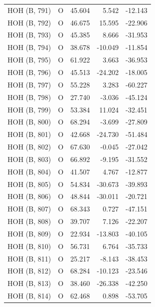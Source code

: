 \begin{longtable}{@{}lcrr@{}}
  \cmidrule(r){1-5}
  HOH (B, 791) & O & 45.604 & 5.542 & -12.143 \\
  \cmidrule(r){1-5}
  HOH (B, 792) & O & 46.675 & 15.595 & -22.906 \\
  \cmidrule(r){1-5}
  HOH (B, 793) & O & 45.385 & 8.666 & -31.953 \\
  \cmidrule(r){1-5}
  HOH (B, 794) & O & 38.678 & -10.049 & -11.854 \\
  \cmidrule(r){1-5}
  HOH (B, 795) & O & 61.922 & 3.663 & -36.953 \\
  \cmidrule(r){1-5}
  HOH (B, 796) & O & 45.513 & -24.202 & -18.005 \\
  \cmidrule(r){1-5}
  HOH (B, 797) & O & 55.228 & 3.283 & -60.227 \\
  \cmidrule(r){1-5}
  HOH (B, 798) & O & 27.740 & -3.036 & -45.124 \\
  \cmidrule(r){1-5}
  HOH (B, 799) & O & 53.384 & 11.024 & -32.451 \\
  \cmidrule(r){1-5}
  HOH (B, 800) & O & 68.294 & -3.699 & -27.809 \\
  \cmidrule(r){1-5}
  HOH (B, 801) & O & 42.668 & -24.730 & -51.484 \\
  \cmidrule(r){1-5}
  HOH (B, 802) & O & 67.630 & -0.045 & -27.042 \\
  \cmidrule(r){1-5}
  HOH (B, 803) & O & 66.892 & -9.195 & -31.552 \\
  \cmidrule(r){1-5}
  HOH (B, 804) & O & 41.507 & 4.767 & -12.877 \\
  \cmidrule(r){1-5}
  HOH (B, 805) & O & 54.834 & -30.673 & -39.893 \\
  \cmidrule(r){1-5}
  HOH (B, 806) & O & 48.844 & -30.011 & -20.721 \\
  \cmidrule(r){1-5}
  HOH (B, 807) & O & 68.343 & 0.727 & -47.151 \\
  \cmidrule(r){1-5}
  HOH (B, 808) & O & 39.707 & 7.126 & -22.207 \\
  \cmidrule(r){1-5}
  HOH (B, 809) & O & 22.934 & -13.803 & -40.105 \\
  \cmidrule(r){1-5}
  HOH (B, 810) & O & 56.731 & 6.764 & -35.733 \\
  \cmidrule(r){1-5}
  HOH (B, 811) & O & 25.217 & -8.143 & -38.453 \\
  \cmidrule(r){1-5}
  HOH (B, 812) & O & 68.284 & -10.123 & -23.546 \\
  \cmidrule(r){1-5}
  HOH (B, 813) & O & 38.460 & -26.338 & -42.250 \\
  \cmidrule(r){1-5}
  HOH (B, 814) & O & 62.468 & 0.898 & -53.705 \\

\end{longtable}
